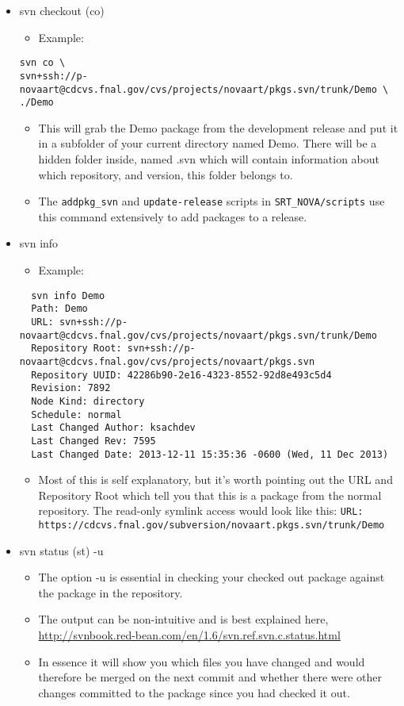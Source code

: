 \documentclass[letterpaper,10pt]{article}
\begin{document}
\begin{itemize}
\item svn checkout (co)
  \begin{itemize}
  \item Example:
  \end{itemize}
  \verb|svn co \|\\
  \verb|svn+ssh://p-novaart@cdcvs.fnal.gov/cvs/projects/novaart/pkgs.svn/trunk/Demo \|\\
  \verb|./Demo|
  \begin{itemize}
  \item This will grab the Demo package from the development release and put it in a subfolder of your current directory named Demo. There will be a hidden folder inside, named .svn which will contain information about which repository, and version, this folder belongs to.
  \item The \verb|addpkg_svn| and \verb|update-release| scripts in \verb|SRT_NOVA/scripts| use this command extensively to add packages to a release.  
  \end{itemize}

\item svn info
  \begin{itemize}
  \item Example:
  \end{itemize}
\begin{verbatim}
  svn info Demo
  Path: Demo
  URL: svn+ssh://p-novaart@cdcvs.fnal.gov/cvs/projects/novaart/pkgs.svn/trunk/Demo
  Repository Root: svn+ssh://p-novaart@cdcvs.fnal.gov/cvs/projects/novaart/pkgs.svn
  Repository UUID: 42286b90-2e16-4323-8552-92d8e493c5d4
  Revision: 7892
  Node Kind: directory
  Schedule: normal
  Last Changed Author: ksachdev
  Last Changed Rev: 7595
  Last Changed Date: 2013-12-11 15:35:36 -0600 (Wed, 11 Dec 2013)
\end{verbatim}
\begin{itemize}
\item Most of this is self explanatory, but it's worth pointing out the URL and Repository Root which tell you that this is a package from the normal repository. The read-only symlink access would look like this: \verb|URL: https://cdcvs.fnal.gov/subversion/novaart.pkgs.svn/trunk/Demo|
\end{itemize}

\item svn status (st) -u
  \begin{itemize}
  \item The option -u is essential in checking your checked out package against the package in the repository.
  \item The output can be non-intuitive and is best explained here, \url{http://svnbook.red-bean.com/en/1.6/svn.ref.svn.c.status.html}
  \item In essence it will show you which files you have changed and would therefore be merged on the next commit and whether there were other changes committed to the package since you had checked it out.
  \end{itemize}


\end{itemize}
\end{document}
